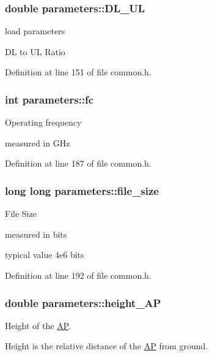 \hypertarget{structparameters_a0d389ff55ad4464ab764f04a551fa394}{
\subsubsection[{D\-L\-\_\-\-U\-L}]{\setlength{\rightskip}{0pt plus 5cm}double parameters\-::\-D\-L\-\_\-\-U\-L}}\label{structparameters_a0d389ff55ad4464ab764f04a551fa394}
load parameters \par
D\-L to U\-L Ratio \par


Definition at line 151 of file common.\-h.

\hypertarget{structparameters_afcbb78167d255c8c249b6e868ae34cb8}{
\subsubsection[{fc}]{\setlength{\rightskip}{0pt plus 5cm}int parameters\-::fc}}\label{structparameters_afcbb78167d255c8c249b6e868ae34cb8}
Operating frequency \par
measured in G\-Hz \par


Definition at line 187 of file common.\-h.

\hypertarget{structparameters_a839992f2d6e75df2b71fa74147cd89fd}{
\subsubsection[{file\-\_\-size}]{\setlength{\rightskip}{0pt plus 5cm}long long parameters\-::file\-\_\-size}}\label{structparameters_a839992f2d6e75df2b71fa74147cd89fd}
File Size \par
measured in bits \par
typical value 4e6 bits \par


Definition at line 192 of file common.\-h.

\hypertarget{structparameters_aeba51b77bd7d93edf7ec54d444a76e5e}{
\subsubsection[{height\-\_\-\-A\-P}]{\setlength{\rightskip}{0pt plus 5cm}double parameters\-::height\-\_\-\-A\-P}}\label{structparameters_aeba51b77bd7d93edf7ec54d444a76e5e}
Height of the \hyperlink{classAP}{A\-P}. \par
Height is the relative distance of the \hyperlink{classAP}{A\-P} from ground. \par


